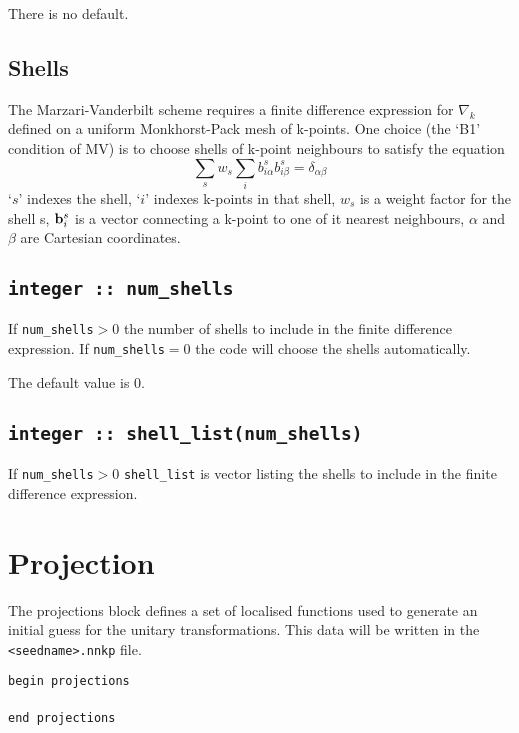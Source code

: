 
There is no default.

\subsection{Shells}

The Marzari-Vanderbilt scheme requires a finite difference expression
for $\nabla_k$ 
defined on a uniform Monkhorst-Pack mesh of k-points. One choice (the
`B1' condition of MV) 
is to choose shells of k-point neighbours to satisfy the equation
\begin{equation}\nonumber
\sum_s w_s \sum_i b_{i\alpha}^s b_{i\beta}^s = \delta_{\alpha\beta}
\end{equation}
`$s$' indexes the shell, `$i$' indexes k-points in that shell, $w_s$ is a weight factor for the shell s, ${\bf b}_{i}^s$
is a vector connecting a k-point to one of it nearest neighbours, $\alpha$ and $\beta$ are Cartesian coordinates.

\subsection[num\_shells]{\tt integer :: num\_shells}

If \verb#num_shells#$>0$ the number of shells to include in the finite difference expression.
If \verb#num_shells#$=0$ the code will choose the shells automatically. 

The default value is 0.

\subsection[shell\_list]{\tt integer :: shell\_list(num\_shells)}

If \verb#num_shells#$>0$ \verb#shell_list# is vector listing the shells
to include in the finite difference expression.

\section{Projection}

 The projections block defines a set of localised functions used to
 generate an initial guess for the unitary transformations. 
This data will be written in the {\tt <seedname>.nnkp} file.

\noindent \verb#begin projections# \\\\
\verb#end projections#

